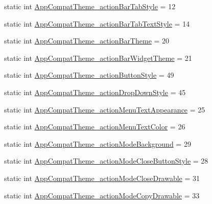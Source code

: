 \begin{DoxyCompactItemize}
static int \hyperlink{classandroid_1_1support_1_1v7_1_1mediarouter_1_1R_1_1styleable_a05c688cad9d1778c9c006d3567c37651}{App\+Compat\+Theme\+\_\+action\+Bar\+Tab\+Style} = 12
\item 
static int \hyperlink{classandroid_1_1support_1_1v7_1_1mediarouter_1_1R_1_1styleable_a943bcdaec9fb96bdbc26392220e88255}{App\+Compat\+Theme\+\_\+action\+Bar\+Tab\+Text\+Style} = 14
\item 
static int \hyperlink{classandroid_1_1support_1_1v7_1_1mediarouter_1_1R_1_1styleable_a4e99b208f1389299006016c4c0a05bfc}{App\+Compat\+Theme\+\_\+action\+Bar\+Theme} = 20
\item 
static int \hyperlink{classandroid_1_1support_1_1v7_1_1mediarouter_1_1R_1_1styleable_ae736ca88412d41362ebb97ce89f3bdbf}{App\+Compat\+Theme\+\_\+action\+Bar\+Widget\+Theme} = 21
\item 
static int \hyperlink{classandroid_1_1support_1_1v7_1_1mediarouter_1_1R_1_1styleable_ac290db9607987bf254279ec5666c5b39}{App\+Compat\+Theme\+\_\+action\+Button\+Style} = 49
\item 
static int \hyperlink{classandroid_1_1support_1_1v7_1_1mediarouter_1_1R_1_1styleable_a39e9da7cc34bb8301e1380ffffd867bc}{App\+Compat\+Theme\+\_\+action\+Drop\+Down\+Style} = 45
\item 
static int \hyperlink{classandroid_1_1support_1_1v7_1_1mediarouter_1_1R_1_1styleable_a0dd3111866a20427ceb1e13b7f1e794d}{App\+Compat\+Theme\+\_\+action\+Menu\+Text\+Appearance} = 25
\item 
static int \hyperlink{classandroid_1_1support_1_1v7_1_1mediarouter_1_1R_1_1styleable_aad5d3bda3f4aedec93a8a1407152b908}{App\+Compat\+Theme\+\_\+action\+Menu\+Text\+Color} = 26
\item 
static int \hyperlink{classandroid_1_1support_1_1v7_1_1mediarouter_1_1R_1_1styleable_a80d019b16ff72b30687fa1c88b005f79}{App\+Compat\+Theme\+\_\+action\+Mode\+Background} = 29
\item 
static int \hyperlink{classandroid_1_1support_1_1v7_1_1mediarouter_1_1R_1_1styleable_ae913f582e350a5afee1675a4e71926f6}{App\+Compat\+Theme\+\_\+action\+Mode\+Close\+Button\+Style} = 28
\item 
static int \hyperlink{classandroid_1_1support_1_1v7_1_1mediarouter_1_1R_1_1styleable_a484eb3582d4bbf2518a037875cfd83c2}{App\+Compat\+Theme\+\_\+action\+Mode\+Close\+Drawable} = 31
\item 
static int \hyperlink{classandroid_1_1support_1_1v7_1_1mediarouter_1_1R_1_1styleable_ad1238ac3d940ce0698cf6d13ff787b60}{App\+Compat\+Theme\+\_\+action\+Mode\+Copy\+Drawable} = 33

\end{DoxyCompactItemize}
